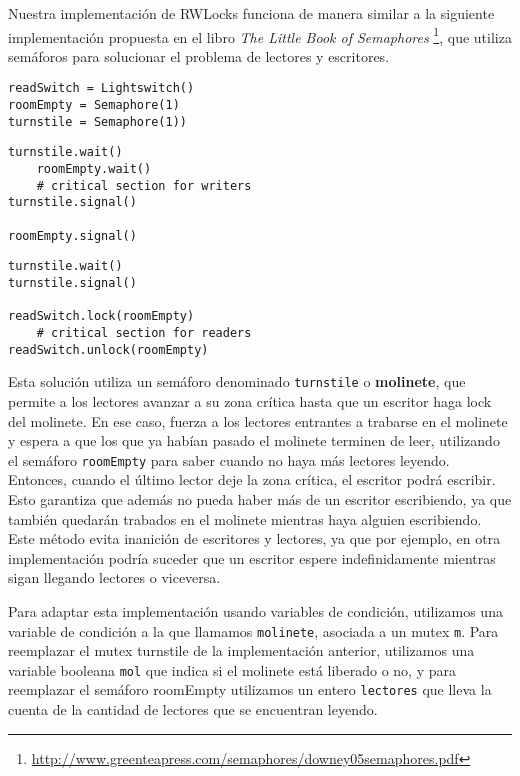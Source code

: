 \par Nuestra implementación de RWLocks funciona de manera similar a la siguiente implementación propuesta en  el libro \textit{The Little Book of Semaphores} \footnote{\url{http://www.greenteapress.com/semaphores/downey05semaphores.pdf}}, que utiliza semáforos para solucionar el problema de lectores y escritores.

\begin{lstlisting}[caption= No-starve readers-writers initialization, style=C]
readSwitch = Lightswitch()
roomEmpty = Semaphore(1)
turnstile = Semaphore(1))
\end{lstlisting}

\begin{lstlisting}[caption= No-starve writer solution, style=C]
turnstile.wait()
	roomEmpty.wait()
	# critical section for writers
turnstile.signal()

roomEmpty.signal()
\end{lstlisting}


\begin{lstlisting}[caption= No-starve reader solution, style=C]
turnstile.wait()
turnstile.signal()

readSwitch.lock(roomEmpty)
	# critical section for readers
readSwitch.unlock(roomEmpty)
\end{lstlisting}

\par Esta solución utiliza un semáforo denominado \texttt{turnstile} o \textbf{molinete}, que permite a los lectores avanzar a su zona crítica hasta que un escritor haga lock del molinete. En ese caso, fuerza a los lectores entrantes a trabarse en el molinete y espera a que los que ya habían pasado el molinete terminen de leer, utilizando el semáforo \texttt{roomEmpty} para saber cuando no haya más lectores leyendo. Entonces, cuando el último lector deje la zona crítica, el escritor podrá escribir. Esto garantiza que además no pueda haber más de un escritor escribiendo, ya que también quedarán trabados en el molinete mientras haya alguien escribiendo. Este método evita inanición de escritores y lectores, ya que por ejemplo, en otra implementación podría suceder que un escritor espere indefinidamente mientras sigan llegando lectores o viceversa.
\par Para adaptar esta implementación usando variables de condición, utilizamos una variable de condición a la que llamamos \texttt{molinete}, asociada a un mutex \texttt{m}. Para reemplazar el mutex turnstile de la implementación anterior, utilizamos una variable booleana \texttt{mol} que indica si el molinete está liberado o no, y para reemplazar el semáforo roomEmpty utilizamos un entero \texttt{lectores} que lleva la cuenta de la cantidad de lectores que se encuentran leyendo.

